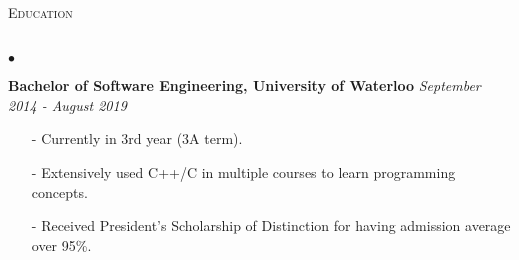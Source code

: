 \documentclass[11pt]{article}
\newcommand{\lineunder}{\vspace*{-8pt} \\ \hspace*{-18pt} \hrulefill \\}
\newcommand{\header}[1]{{\hspace*{-15pt}\vspace*{6pt} \textsc{#1}} \vspace*{-6pt} \lineunder }
\newenvironment{achievements}{\begin{list}{$\bullet$}{\topsep 0pt \itemsep -1.5pt \leftmargin 5pt}}{\vspace*{4pt}\end{list}}
\begin{document}
\vspace{6pt}

\header{\fontsize{11.4}{10}\selectfont  Education}
\begin{achievements}
\item \textbf{Bachelor of Software Engineering, University of Waterloo} \hfill \textit {September 2014 - August 2019}
\begin{itemize}
\item[-] Currently in 3rd year (3A term).
\vspace{3pt}
\item[-] Extensively used C++/C in multiple courses to learn programming concepts.
\vspace{3pt}
\item[-] Received President's Scholarship of Distinction for having admission average over 95\%.
\end{itemize}
\end{achievements}
\end{document}
